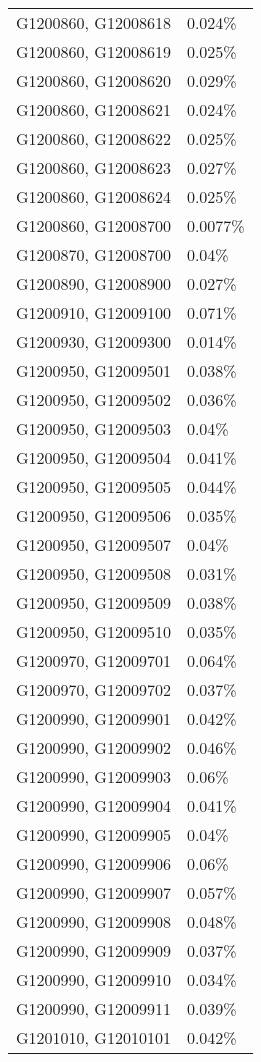 \begin{longtable}[]{@{}ll@{}}
G1200860, G12008618 & 0.024\% \\
G1200860, G12008619 & 0.025\% \\
G1200860, G12008620 & 0.029\% \\
G1200860, G12008621 & 0.024\% \\
G1200860, G12008622 & 0.025\% \\
G1200860, G12008623 & 0.027\% \\
G1200860, G12008624 & 0.025\% \\
G1200860, G12008700 & 0.0077\% \\
G1200870, G12008700 & 0.04\% \\
G1200890, G12008900 & 0.027\% \\
G1200910, G12009100 & 0.071\% \\
G1200930, G12009300 & 0.014\% \\
G1200950, G12009501 & 0.038\% \\
G1200950, G12009502 & 0.036\% \\
G1200950, G12009503 & 0.04\% \\
G1200950, G12009504 & 0.041\% \\
G1200950, G12009505 & 0.044\% \\
G1200950, G12009506 & 0.035\% \\
G1200950, G12009507 & 0.04\% \\
G1200950, G12009508 & 0.031\% \\
G1200950, G12009509 & 0.038\% \\
G1200950, G12009510 & 0.035\% \\
G1200970, G12009701 & 0.064\% \\
G1200970, G12009702 & 0.037\% \\
G1200990, G12009901 & 0.042\% \\
G1200990, G12009902 & 0.046\% \\
G1200990, G12009903 & 0.06\% \\
G1200990, G12009904 & 0.041\% \\
G1200990, G12009905 & 0.04\% \\
G1200990, G12009906 & 0.06\% \\
G1200990, G12009907 & 0.057\% \\
G1200990, G12009908 & 0.048\% \\
G1200990, G12009909 & 0.037\% \\
G1200990, G12009910 & 0.034\% \\
G1200990, G12009911 & 0.039\% \\
G1201010, G12010101 & 0.042\% \\

\end{longtable}
